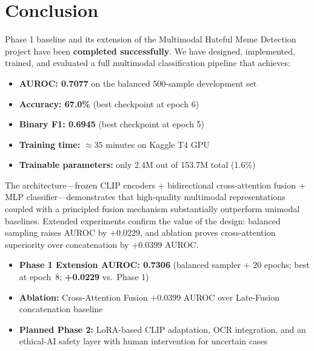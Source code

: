 \documentclass[12pt,a4paper]{article}
\begin{document}
\section{Conclusion}

Phase 1 baseline and its extension of the Multimodal Hateful Meme Detection project have been \textbf{completed successfully}. We have designed, implemented, trained, and evaluated a full multimodal classification pipeline that achieves:

\begin{tcolorbox}[result, title={Phase 1 Baseline Summary}]
\begin{itemize}
  \item \textbf{AUROC: 0.7077} on the balanced 500-sample development set
  \item \textbf{Accuracy: 67.0\%} (best checkpoint at epoch 6)
  \item \textbf{Binary F1: 0.6945} (best checkpoint at epoch 5)
  \item \textbf{Training time:} $\approx 35$ minutes on Kaggle T4 GPU
  \item \textbf{Trainable parameters:} only 2.4M out of 153.7M total (1.6\%)
\end{itemize}
\end{tcolorbox}

The architecture---frozen CLIP encoders + bidirectional cross-attention fusion + MLP classifier---demonstrates that high-quality multimodal representations coupled with a principled fusion mechanism substantially outperform unimodal baselines. Extended experiments confirm the value of the design: balanced sampling raises AUROC by $+0.0229$, and ablation proves cross-attention superiority over concatenation by $+0.0399$ AUROC.

\begin{tcolorbox}[result, title={Extended Results: Phase 1 Extension \& Ablation}]
\begin{itemize}
  \item \textbf{Phase 1 Extension AUROC: 0.7306} (balanced sampler + 20 epochs; best at epoch~8; \textbf{+0.0229} vs.\ Phase 1)
  \item \textbf{Ablation:} Cross-Attention Fusion $+0.0399$ AUROC over Late-Fusion concatenation baseline
  \item \textbf{Planned Phase 2:} LoRA-based CLIP adaptation, OCR integration, and an ethical-AI safety layer with human intervention for uncertain cases
\end{itemize}
\end{tcolorbox}
\end{document}
